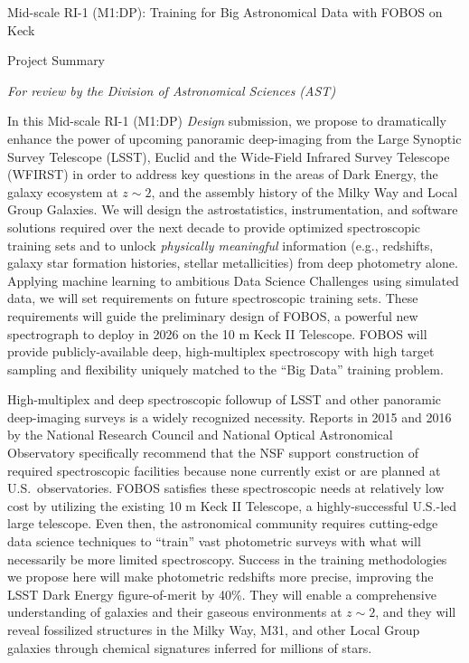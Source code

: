 \documentclass[oneside,11pt]{amsart}
\newcommand{\comment}[2][todo]{{\color{#1}[[{\bf #2}]]}}
\begin{document}


\vspace*{-1.5cm}

\centerline{\textsf {\Large Mid-scale RI-1 (M1:DP): Training for Big Astronomical Data with FOBOS on Keck}}
\centerline{\textsf {\large Project Summary}}
\centerline{\emph{{\small For review by the Division of Astronomical Sciences (AST)}}}


 In this Mid-scale RI-1 (M1:DP) \emph{Design} submission, we propose to dramatically enhance
the power of upcoming panoramic deep-imaging from the Large Synoptic Survey Telescope (LSST), Euclid and the Wide-Field
Infrared Survey Telescope (WFIRST) in order to address key questions in the areas of Dark
Energy, the galaxy ecosystem at $z\sim2$, and the assembly history of the Milky Way and Local Group Galaxies.  We will
design the astrostatistics, instrumentation, and software solutions required over the next decade to provide optimized
spectroscopic training sets and to unlock \emph{physically meaningful} information (e.g., redshifts, galaxy star
formation histories, stellar metallicities) from deep photometry alone.  Applying machine learning to ambitious Data
Science Challenges using simulated data, we will set requirements on future spectroscopic training sets.  These
requirements will guide the preliminary design of FOBOS, a powerful new spectrograph to deploy in 2026 on the 10 m
Keck II Telescope.  FOBOS will provide publicly-available deep, high-multiplex spectroscopy with high target
sampling and flexibility uniquely matched to the ``Big Data'' training problem.


 High-multiplex and deep spectroscopic followup of LSST and other panoramic
deep-imaging surveys is a widely recognized necessity.  Reports in 2015 and 2016 by the National Research Council and
National Optical Astronomical Observatory specifically recommend that the NSF support construction of required
spectroscopic facilities because none currently exist or are planned at U.S.\ observatories.  FOBOS satisfies these
spectroscopic needs at relatively low cost by utilizing the existing 10 m Keck II Telescope, a highly-successful
U.S.-led large telescope.  Even then, the astronomical community requires cutting-edge data science techniques to
``train'' vast photometric surveys with what will necessarily be more limited spectroscopy.  Success in the training
methodologies we propose here will make photometric redshifts more precise, improving the LSST Dark Energy
figure-of-merit by 40\%.  They will enable a comprehensive understanding of galaxies and their gaseous environments at
$z\sim2$, and they will reveal fossilized structures in the Milky Way, M31, and other Local Group galaxies through
chemical signatures inferred for millions of stars.
\end{document}
